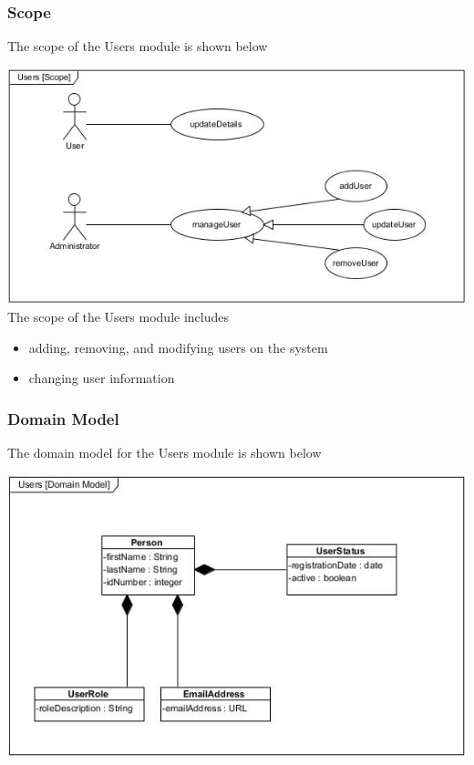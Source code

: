 \documentclass[a4paper,12pt]{article}
\begin{document}
	\subsubsection{Scope}
	The scope of the Users module is shown below
	
	\includegraphics[width=1\textwidth]{./Pictures/UML/usersScope.jpg}\\[1.5cm]
	
	{\noindent}The scope of the Users module includes
	\begin{itemize}
		\item adding, removing, and modifying users on the system
		\item changing user information
	\end{itemize}
	
	\subsubsection{Domain Model}
	The domain model for the Users module is shown below
	
	\includegraphics[width=1\textwidth]{./Pictures/UML/usersDomainModel.jpg}\\[1.5cm]	
\end{document}

